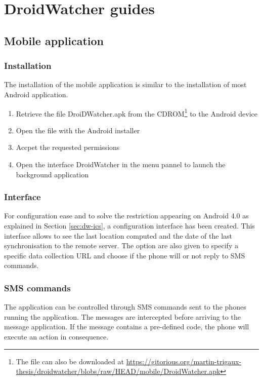 \chapter{DroidWatcher guides}

\label{dw-guide}

\section{Mobile application}
\label{sec:dw-user-manual}

\subsection{Installation}

The installation of the mobile application is similar to the installation of most Android application.

\begin{enumerate}
\item Retrieve the file DroiDWatcher.apk from the CDROM\footnote{The file can also be downloaded at \url{https://gitorious.org/martin-trigaux-thesis/droidwatcher/blobs/raw/HEAD/mobile/DroidWatcher.apk}} to the Android device
\item Open the file with the Android installer
\item Accpet the requested permissions
\item Open the interface DroidWatcher in the menu pannel to launch the background application
\end{enumerate}

\subsection{Interface}
\label{sec:dw-gui}

For configuration ease and to solve the restriction appearing on Android 4.0 as explained in Section \ref{sec:dw-ics}, a configuration interface has been created.
This interface allows to see the last location computed and the date of the last synchronisation to the remote server.
The option are also given to specify a specific data collection URL and choose if the phone will or not reply to SMS commands.

\subsection{SMS commands}
\label{sec:dw-smscom}

The application can be controlled through SMS commands sent to the phones running the application.
The messages are intercepted before arriving to the message application.
If the message contains a pre-defined code, the phone will execute an action in consequence.

